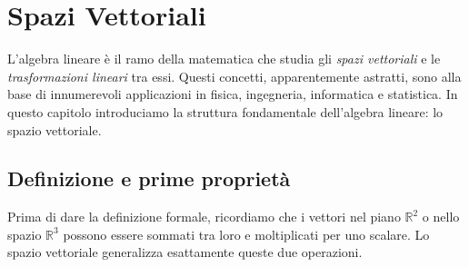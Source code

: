 \chapter{Spazi Vettoriali}
\label{ch:spazi-vettoriali}

L'algebra lineare è il ramo della matematica che studia gli \emph{spazi vettoriali} e le \emph{trasformazioni lineari} tra essi. Questi concetti, apparentemente astratti, sono alla base di innumerevoli applicazioni in fisica, ingegneria, informatica e statistica. In questo capitolo introduciamo la struttura fondamentale dell'algebra lineare: lo spazio vettoriale.

\section{Definizione e prime proprietà}
\label{sec:def-spazio-vettoriale}

Prima di dare la definizione formale, ricordiamo che i vettori nel piano $\mathbb{R}^2$ o nello spazio $\mathbb{R}^3$ possono essere sommati tra loro e moltiplicati per uno scalare. Lo spazio vettoriale generalizza esattamente queste due operazioni.

